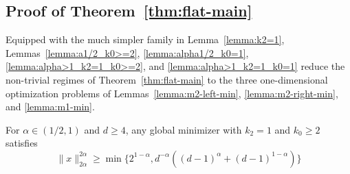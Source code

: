 \documentclass[11pt]{article}
\begin{document}
\subsection{Proof of Theorem~\ref{thm:flat-main}}
Equipped with the much simpler family in Lemma~\ref{lemma:k2=1}, Lemmas~\ref{lemma:a1/2_k0>=2}, \ref{lemma:alpha1/2_k0=1}, \ref{lemma:alpha>1_k2=1_k0>=2}, and \ref{lemma:alpha>1_k2=1_k0=1} reduce the non-trivial regimes of Theorem~\ref{thm:flat-main} to the three one-dimensional optimization problems of Lemmas~\ref{lemma:m2-left-min}, \ref{lemma:m2-right-min}, and \ref{lemma:m1-min}. 

\begin{lemma}\label{lemma:a1/2_k0>=2}
    For $\alpha \in (1/2,1)$ and $d\geq 4$, any global minimizer with $k_2=1$ and $k_0\geq 2$ satisfies
    $$\|x\|_{2\alpha}^{2\alpha}\geq \min\{2^{1-\alpha},d^{-\alpha}((d-1)^{\alpha}+(d-1)^{1-\alpha})\}$$
\end{lemma}
\end{document}
